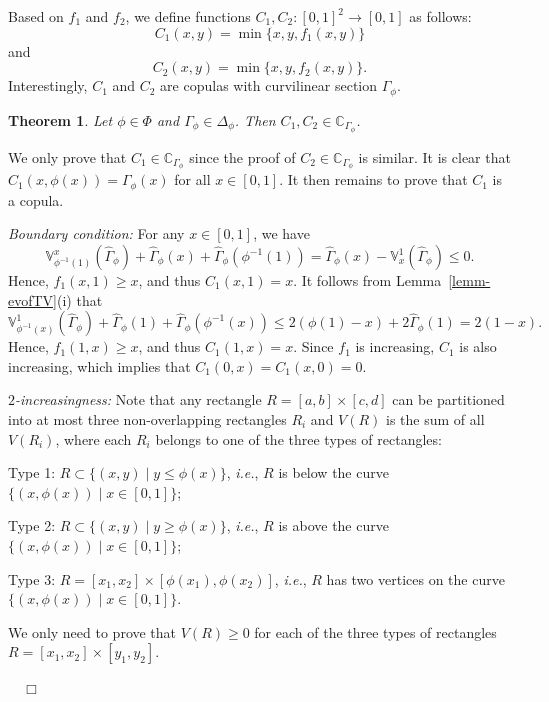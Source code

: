 \documentclass[12pt]{article}
\renewenvironment{proof}{\noindent{\bf Proof.}}{~~$\Box$}
\theoremstyle{plain}
\newtheorem{thrm}{Theorem}[section]
\theoremstyle{definition}
\begin{document}
Based on $f_1$ and $f_2$, we define functions $C_1, C_2\colon [0, 1]^2\to [0, 1]$ as follows:
\begin{equation*}
C_1(x, y)=\min\{x, y, f_1(x, y)\}
\end{equation*}
and
\begin{equation*}
C_2(x, y)=\min\{x, y, f_2(x, y)\}.
\end{equation*}
Interestingly, $C_1$ and $C_2$ are copulas with curvilinear section $\Gamma_\phi$.
\begin{thrm}
Let $\phi\in\Phi$ and $\Gamma_\phi\in\Delta_\phi$. Then $C_1, C_2\in\mathbb{C}_{\Gamma_\phi}$.
\end{thrm}
\begin{proof}
We only prove that $C_1\in \mathbb{C}_{\Gamma_\phi}$ since the proof of $C_2\in \mathbb{C}_{\Gamma_\phi}$ is similar.
It is clear that $C_{1}(x, \phi(x))=\Gamma_\phi(x)$ for all $x\in[0, 1]$. It then remains to prove that $C_1$ is a copula.

\emph{Boundary condition:} For any $x\in[0, 1]$, we have
\[
\mathbb{V}^{x}_{\phi^{-1}(1)}(\hat{\Gamma}_{\phi})+\hat{\Gamma}_{\phi}(x)+\hat{\Gamma}_{\phi}(\phi^{-1}(1))
=\hat{\Gamma}_{\phi}(x)-\mathbb{V}^{1}_{x}(\hat{\Gamma}_{\phi})\leq 0.
\]
Hence, $f_1(x, 1)\geq x$, and thus $C_1(x, 1)=x$. It follows from Lemma~\ref{lemm-evofTV}(i) that
\[
\mathbb{V}^{1}_{\phi^{-1}(x)}(\hat{\Gamma}_{\phi})+\hat{\Gamma}_{\phi}(1)+\hat{\Gamma}_{\phi}(\phi^{-1}(x))\leq 2(\phi(1)-x)+2\hat{\Gamma}_{\phi}(1)=2(1-x).
\]
Hence, $f_1(1, x)\geq x$, and thus $C_1(1, x)=x$. Since $f_1$ is increasing, $C_1$ is also increasing, which implies that
$C_1(0, x)=C_1(x, 0)=0$.

\emph{$2$-increasingness:} Note that any rectangle $R=[a, b]\times [c, d]$ can be partitioned into at most three non-overlapping rectangles $R_i$ and $V(R)$ is the sum of all $V(R_i)$,
where each $R_i$ belongs to one of the three types of rectangles:

\noindent Type 1: $R\subset\{(x, y)\mid y\leq\phi(x)\}$, \emph{i.e.}, $R$ is below the curve $\{(x, \phi(x))\mid x\in [0, 1]\}$;

\noindent Type 2: $R\subset\{(x, y)\mid y\geq\phi(x)\}$, \emph{i.e.}, $R$ is above the curve $\{(x, \phi(x))\mid x\in [0, 1]\}$;

\noindent Type 3: $R=[x_1, x_2]\times [\phi(x_1), \phi(x_2)]$, \emph{i.e.}, $R$ has two vertices on the curve $\{(x, \phi(x))\mid x\in [0, 1]\}$.

\noindent We only need to prove that $V(R)\geq 0$ for each of the three types of rectangles $R=[x_1, x_2]\times [y_1, y_2]$.


\end{proof}
\end{document}
